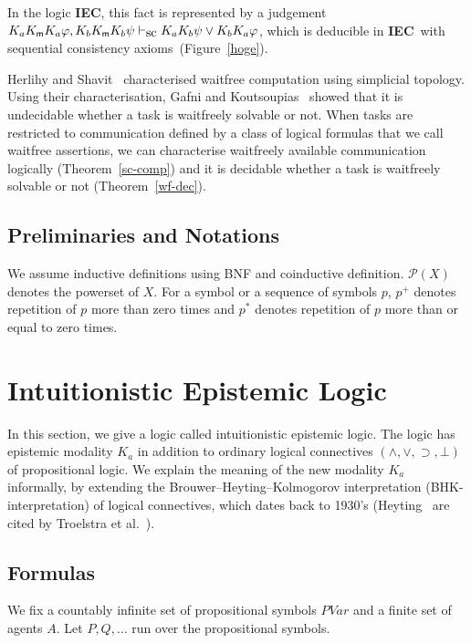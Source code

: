 \documentclass[doctor]{iscs-thesis}
\newcommand{\powerset}[1]{{\mathcal P({#1})}}
\newcommand{\vdashsc}{\vdash_{\mbox{\rm sc}}}
\newcommand{\iec}{{\rm {\textbf{IEC}}}}
\newcommand{\memory}{{\sf m}}
\begin{document}
In the
 logic \iec, this fact is represented by a judgement $K_aK_\memory{}K_a\varphi,
K_bK_\memory{}K_b\psi\vdashsc K_aK_b\psi\vee K_bK_a\varphi$,
which is deducible in \iec\, with
sequential consistency axioms~(Figure~\ref{hoge}).

Herlihy and Shavit~\cite{herlihy1999topological} characterised waitfree computation using
simplicial topology.
Using their characterisation,
Gafni and Koutsoupias~\cite{gafni1999three}
 showed that it is undecidable whether a task is waitfreely solvable
 or not.
When tasks are restricted to communication defined by 
a class of logical formulas that we call waitfree assertions,
we can characterise waitfreely available communication logically (Theorem~\ref{sc-comp})
and 
it is decidable whether a task is waitfreely solvable or not (Theorem~\ref{wf-dec}).

\subsection{Preliminaries and Notations}

We assume inductive definitions using BNF and coinductive definition.
$\powerset X$ denotes the powerset of $X$.
For a symbol or a sequence of symbols $p$, 
$p^+$ denotes repetition of $p$ more than zero times and
$p^*$ denotes repetition of $p$ more than or equal to zero times.

\section{Intuitionistic Epistemic Logic}
\label{iec}

In this section, we give a logic called intuitionistic epistemic logic.
The logic has epistemic modality $K_a$ in addition to ordinary logical connectives
$(\wedge, \vee, \supset, \bot)$ of propositional logic.
We explain the meaning of the new modality $K_a$ informally, by extending 
the Brouwer--Heyting--Kolmogorov interpretation (BHK-interpretation) of logical
connectives, which dates back to 1930's
 (Heyting~\cite{heyting1930formalen, heyting1931intuitionistische}
 are cited by Troelstra et al.~\cite{troelstra1988constructivism}).

\subsection{Formulas}

We fix a countably infinite set of propositional symbols
$PVar$ and a finite set of agents $A$.
Let $P, Q, \ldots$ run over the propositional symbols.
\end{document}

